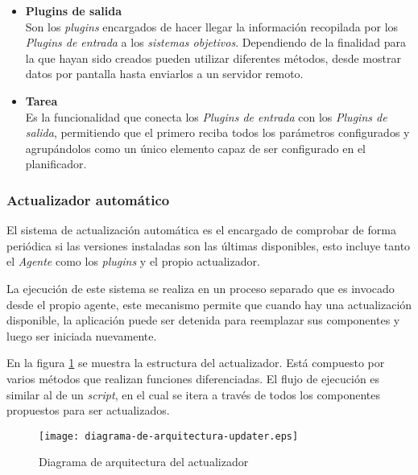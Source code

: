 \begin{enumerate}
\begin{itemize}
                        \item \textbf{Plugins de salida} \\
                        Son los \textit{plugins} encargados de hacer llegar la información recopilada por los \textit{Plugins de entrada} a los \textit{sistemas objetivos}. Dependiendo de la finalidad para la que hayan sido creados pueden utilizar diferentes métodos, desde mostrar datos por pantalla hasta enviarlos a un servidor remoto.
                        
                        \item \textbf{Tarea} \\
                        Es la funcionalidad que conecta los \textit{Plugins de entrada} con los \textit{Plugins de salida}, permitiendo que el primero reciba todos los parámetros configurados y agrupándolos como un único elemento capaz de ser configurado en el planificador.
                        
                    \end{itemize}
            \end{enumerate}

        \subsubsection{Actualizador automático}
            El sistema de actualización automática es el encargado de comprobar de forma periódica si las versiones instaladas son las últimas disponibles, esto incluye tanto el \textit{Agente} como los \textit{plugins} y el propio actualizador.
            
            La ejecución de este sistema se realiza en un proceso separado que es invocado desde el propio agente, este mecanismo permite que cuando hay una actualización disponible, la aplicación puede ser detenida para reemplazar sus componentes y luego ser iniciada nuevamente.
            
            En la figura \ref{fig:client-diagram} se muestra la estructura del actualizador. Está compuesto por varios métodos que realizan funciones diferenciadas. El flujo de ejecución es similar al de un \textit{script}, en el cual se itera a través de todos los componentes propuestos para ser actualizados. 
            
            \begin{figure}[h!]
            \centering
                \texttt{[image: diagrama-de-arquitectura-updater.eps]}
                \caption{Diagrama de arquitectura del actualizador}
                \label{fig:client-diagram}
            \end{figure}
            
